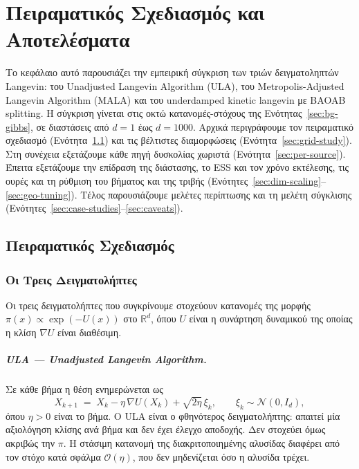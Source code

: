 \chapter{Πειραματικός Σχεδιασμός και Αποτελέσματα}
\label{chap:experiments}

Το κεφάλαιο αυτό παρουσιάζει την εμπειρική σύγκριση των τριών δειγματοληπτών Langevin:
του Unadjusted Langevin Algorithm (ULA), του Metropolis-Adjusted Langevin
Algorithm (MALA) και του underdamped kinetic langevin με BAOAB splitting. Η σύγκριση
γίνεται στις οκτώ κατανομές-στόχους της Ενότητας~\ref{sec:bg-gibbs}, σε διαστάσεις από $d=1$
έως $d=1000$. Αρχικά περιγράφουμε τον πειραματικό σχεδιασμό
(Ενότητα~\ref{sec:exp-design}) και τις βέλτιστες διαμορφώσεις
(Ενότητα~\ref{sec:grid-study}). Στη συνέχεια εξετάζουμε κάθε πηγή δυσκολίας
χωριστά (Ενότητα~\ref{sec:per-source}). Έπειτα εξετάζουμε την επίδραση της
διάστασης, το ESS και τον χρόνο εκτέλεσης, τις ουρές και τη ρύθμιση του βήματος
και της τριβής (Ενότητες~\ref{sec:dim-scaling}--\ref{sec:geo-tuning}). Τέλος
παρουσιάζουμε μελέτες περίπτωσης και τη μελέτη σύγκλισης
(Ενότητες~\ref{sec:case-studies}--\ref{sec:caveats}).


\section{Πειραματικός Σχεδιασμός}
\label{sec:exp-design}

\subsection{Οι Τρεις Δειγματολήπτες}

Οι τρεις δειγματολήπτες που συγκρίνουμε στοχεύουν κατανομές της μορφής
$\pi(x) \propto \exp(-U(x))$ στο $\mathbb{R}^d$, όπου $U$ είναι η συνάρτηση
δυναμικού της οποίας η κλίση $\nabla U$ είναι διαθέσιμη.

\paragraph{ULA --- Unadjusted Langevin Algorithm.}
Σε κάθε βήμα η θέση ενημερώνεται ως
\begin{equation}
  X_{k+1} \;=\; X_k - \eta\, \nabla U(X_k) + \sqrt{2\eta}\, \xi_k,
  \qquad \xi_k \sim \mathcal{N}(0, I_d),
\end{equation}
όπου $\eta>0$ είναι το βήμα. Ο ULA είναι ο φθηνότερος δειγματολήπτης:
απαιτεί μία αξιολόγηση κλίσης ανά βήμα και δεν έχει έλεγχο αποδοχής.
Δεν στοχεύει όμως ακριβώς την $\pi$. Η στάσιμη κατανομή της διακριτοποιημένης
αλυσίδας διαφέρει από τον στόχο κατά σφάλμα $\mathcal{O}(\eta)$, που δεν
μηδενίζεται όσο η αλυσίδα τρέχει.

